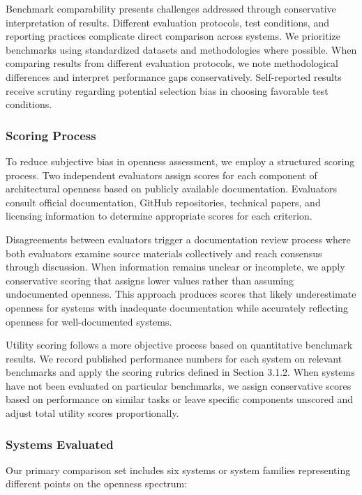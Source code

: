 Benchmark comparability presents challenges addressed through conservative interpretation of results. Different evaluation protocols, test conditions, and reporting practices complicate direct comparison across systems. We prioritize benchmarks using standardized datasets and methodologies where possible. When comparing results from different evaluation protocols, we note methodological differences and interpret performance gaps conservatively. Self-reported results receive scrutiny regarding potential selection bias in choosing favorable test conditions.

\subsubsection{Scoring Process}

To reduce subjective bias in openness assessment, we employ a structured scoring process. Two independent evaluators assign scores for each component of architectural openness based on publicly available documentation. Evaluators consult official documentation, GitHub repositories, technical papers, and licensing information to determine appropriate scores for each criterion.

Disagreements between evaluators trigger a documentation review process where both evaluators examine source materials collectively and reach consensus through discussion. When information remains unclear or incomplete, we apply conservative scoring that assigns lower values rather than assuming undocumented openness. This approach produces scores that likely underestimate openness for systems with inadequate documentation while accurately reflecting openness for well-documented systems.

Utility scoring follows a more objective process based on quantitative benchmark results. We record published performance numbers for each system on relevant benchmarks and apply the scoring rubrics defined in Section 3.1.2. When systems have not been evaluated on particular benchmarks, we assign conservative scores based on performance on similar tasks or leave specific components unscored and adjust total utility scores proportionally.

\subsubsection{Systems Evaluated}

Our primary comparison set includes six systems or system families representing different points on the openness spectrum:

